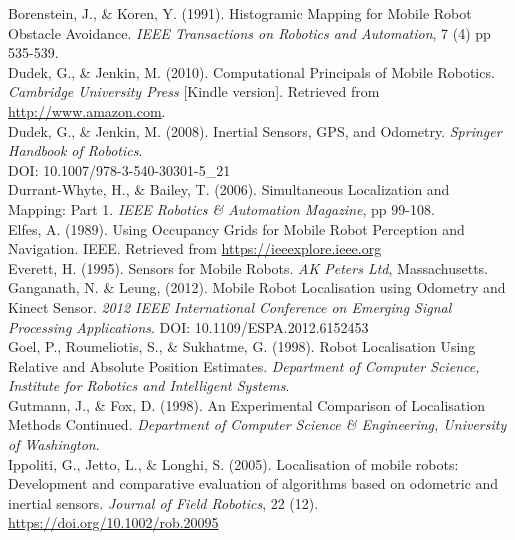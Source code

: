 \documentclass[a4paper]{article}
\begin{document}
\normalsize
Borenstein, J., \& Koren, Y. (1991). Histogramic Mapping for Mobile Robot Obstacle Avoidance. \textit{IEEE Transactions on Robotics and Automation}, 7 (4) pp 535-539.\\

\normalsize
Dudek, G., \& Jenkin, M. (2010). Computational Principals of Mobile Robotics. \textit{Cambridge University Press} [Kindle version]. Retrieved from \url{http://www.amazon.com}.\\

Dudek, G., \& Jenkin, M. (2008). Inertial Sensors, GPS, and Odometry. \textit{Springer Handbook of Robotics}.\\DOI: 10.1007/978-3-540-30301-5\_21\\

\normalsize
Durrant-Whyte, H., \& Bailey, T. (2006). Simultaneous Localization and Mapping: Part 1. \textit{IEEE Robotics \& Automation Magazine}, pp 99-108.\\

\normalsize
Elfes, A. (1989). Using Occupancy Grids for Mobile Robot Perception and Navigation. {IEEE}. Retrieved from \url{https://ieeexplore.ieee.org}\\

\normalsize
Everett, H. (1995). Sensors for Mobile Robots. \textit{AK Peters Ltd}, Massachusetts.\\

\normalsize
Ganganath, N. \& Leung, (2012). Mobile Robot Localisation using Odometry and Kinect Sensor. \textit{2012 IEEE International Conference on Emerging Signal Processing Applications}. DOI: 10.1109/ESPA.2012.6152453\\

\normalsize
Goel, P., Roumeliotis, S., \& Sukhatme, G. (1998). Robot Localisation Using Relative and Absolute Position Estimates. \textit{Department of Computer Science, Institute for Robotics and Intelligent Systems}.\\ 

\normalsize
Gutmann, J., \& Fox, D. (1998). An Experimental Comparison of Localisation Methods Continued. \textit{Department of Computer Science \& Engineering, University of Washington}.\\

\normalsize
Ippoliti, G., Jetto, L., \& Longhi, S. (2005). Localisation of mobile robots: Development and comparative evaluation of algorithms based on odometric and inertial sensors. \textit{Journal of Field Robotics}, 22 (12). \url{https://doi.org/10.1002/rob.20095}\\
\end{document}
